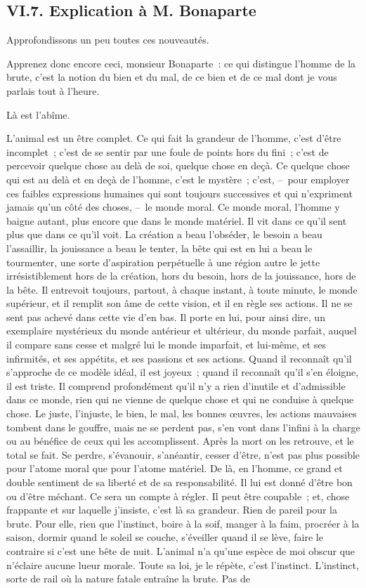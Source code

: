 \documentclass[french,twoside]{book} %
\begin{document}
\subsection[{VI.7. Explication à M. Bonaparte}]{VI.7. Explication à M. Bonaparte}
\noindent Approfondissons un peu toutes ces nouveautés.\par
Apprenez donc encore ceci, monsieur Bonaparte : ce qui distingue l’homme de la brute, c’est la notion du bien et du mal, de ce bien et de ce mal dont je vous parlais tout à l’heure.\par
Là est l’abîme.\par
L’animal est un être complet. Ce qui fait la grandeur de l’homme, c’est d’être incomplet ; c’est de se sentir par une foule de points hors du fini ; c’est de percevoir quelque chose au delà de soi, quelque chose en deçà. Ce quelque chose qui est au delà et en deçà de l’homme, c’est le mystère ; c’est, – pour employer ces faibles expressions humaines qui sont toujours successives et qui n’expriment jamais qu’un côté des choses, – le monde moral. Ce monde moral, l’homme y baigne autant, plus encore que dans le monde matériel. Il vit dans ce qu’il sent plus que dans ce qu’il voit. La création a beau l’obséder, le besoin a beau l’assaillir, la jouissance a beau le tenter, la bête qui est en lui a beau le tourmenter, une sorte d’aspiration perpétuelle à une région autre le jette irrésistiblement hors de la création, hors du besoin, hors de la jouissance, hors de la bête. Il entrevoit toujours, partout, à chaque instant, à toute minute, le monde supérieur, et il remplit son âme de cette vision, et il en règle ses actions. Il ne se sent pas achevé dans cette vie d’en bas. Il porte en lui, pour ainsi dire, un exemplaire mystérieux du monde antérieur et ultérieur, du monde parfait, auquel il compare sans cesse et malgré lui le monde imparfait, et lui-même, et ses infirmités, et ses appétits, et ses passions et ses actions. Quand il reconnaît qu’il s’approche de ce modèle idéal, il est joyeux ; quand il reconnaît qu’il s’en éloigne, il est triste. Il comprend profondément qu’il n’y a rien d’inutile et d’admissible dans ce monde, rien qui ne vienne de quelque chose et qui ne conduise à quelque chose. Le juste, l’injuste, le bien, le mal, les bonnes œuvres, les actions mauvaises tombent dans le gouffre, mais ne se perdent pas, s’en vont dans l’infini à la charge ou au bénéfice de ceux qui les accomplissent. Après la mort on les retrouve, et le total se fait. Se perdre, s’évanouir, s’anéantir, cesser d’être, n’est pas plus possible pour l’atome moral que pour l’atome matériel. De là, en l’homme, ce grand et double sentiment de sa liberté et de sa responsabilité. Il lui est donné d’être bon ou d’être méchant. Ce sera un compte à régler. Il peut être coupable ; et, chose frappante et sur laquelle j’insiste, c’est là sa grandeur. Rien de pareil pour la brute. Pour elle, rien que l’instinct, boire à la soif, manger à la faim, procréer à la saison, dormir quand le soleil se couche, s’éveiller quand il se lève, faire le contraire si c’est une bête de nuit. L’animal n’a qu’une espèce de moi obscur que n’éclaire aucune lueur morale. Toute sa loi, je le répète, c’est l’instinct. L’instinct, sorte de rail où la nature fatale entraîne la brute. Pas de 
\end{document}
